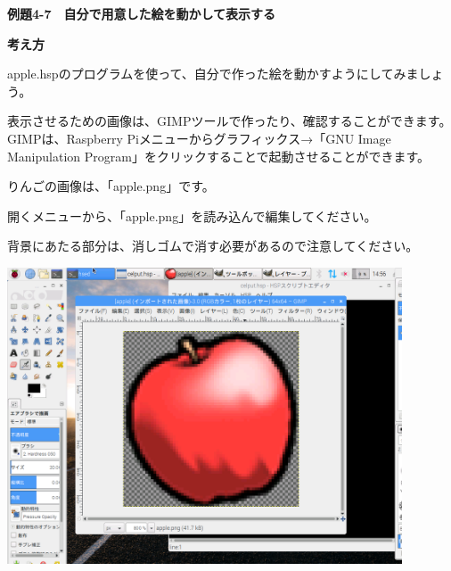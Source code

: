 \documentclass[a4paper,dvipdfmx]{jarticle}
\newcommand\textstyleqwerty[1]{#1}
\begin{document}
\bigskip

\clearpage
\textstyleqwerty{\textbf{例題4-7　自分で用意した絵を動かして表示する}}


\bigskip

{\bfseries
考え方}


\bigskip

apple.hspのプログラムを使って、自分で作った絵を動かすようにしてみましょう。

表示させるための画像は、GIMPツールで作ったり、確認することができます。GIMPは、Raspberry
Piメニューからグラフィックス→「GNU Image
Manipulation
Program」をクリックすることで起動させることができます。

りんごの画像は、「apple.png」です。

開くメニューから、「apple.png」を読み込んで編集してください。

背景にあたる部分は、消しゴムで消す必要があるので注意してください。


\bigskip



\begin{center}
\includegraphics[width=11.712cm,height=8.784cm]{text04-img/text04-img021.png}

\end{center}

\bigskip


\bigskip


\bigskip


\bigskip


\bigskip


\bigskip


\bigskip


\bigskip
\end{document}

